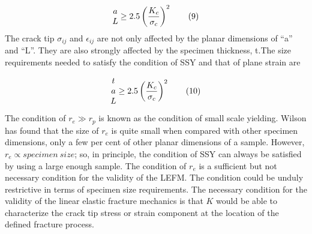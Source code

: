 \documentclass[12pt]{article}
\begin{document}
\begin{align*}
    \begin{array}{@{}c@{}} a\\L \end{array} \geq 2.5 \left( \frac{K_c}{\sigma_c}\right) ^2 \tag{9} \label{9}
\end{align*}
The crack tip $\sigma_{ij}$ and $\epsilon_{ij}$ are not only affected by the planar dimensions of “a” and “L”. They are also
strongly affected by the specimen thickness, t.The size requirements needed to
satisfy the condition of SSY and that of plane strain are
 
\begin{align*}
    \begin{array}{@{}c@{}} t\\a\\L \end{array} \geq 2.5 \left( \frac{K_c}{\sigma_c}\right) ^2 \tag{10} \label{10}
\end{align*}
The condition of $r_e \gg r_p$ is known as the condition of small scale yielding. Wilson has found that
the size of $r_e$ is quite small when compared with other specimen dimensions, only a few per cent of other
planar dimensions of a sample. However, $r_e \propto specimen\ size$; so, in principle, the
condition of SSY can always be satisfied by using a large enough sample. The condition of $r_e$ is a
sufficient but not necessary condition for the validity of the LEFM. The condition could be unduly
restrictive in terms of specimen size requirements. The necessary condition for the validity of the linear
elastic fracture mechanics is that $K$ would be able to characterize the crack tip stress or strain
component at the location of the defined fracture process.
\end{document}

